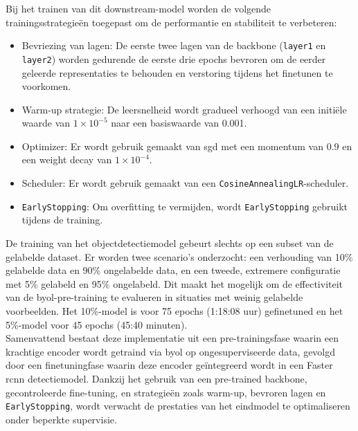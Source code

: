 \clearpage

Bij het trainen van dit downstream-model worden de volgende trainingsstrategieën toegepast om de performantie en stabiliteit te verbeteren:

\begin{itemize}
    \item Bevriezing van lagen: De eerste twee lagen van de backbone (\texttt{layer1} en \texttt{layer2}) worden gedurende de eerste drie epochs bevroren om de eerder geleerde representaties te behouden en verstoring tijdens het finetunen te voorkomen.
    \item Warm-up strategie: De leersnelheid wordt gradueel verhoogd van een initiële waarde van $1 \times 10^{-5}$ naar een basiswaarde van 0.001.
    \item Optimizer: Er wordt gebruik gemaakt van \gls{sgd} met een momentum van 0.9 en een weight decay van $1 \times 10^{-4}$.
    \item Scheduler: Er wordt gebruik gemaakt van een \texttt{CosineAnnealingLR}-scheduler.
    \item \texttt{EarlyStopping}: Om overfitting te vermijden, wordt \texttt{EarlyStopping} gebruikt tijdens de training.
\end{itemize}

De training van het objectdetectiemodel gebeurt slechts op een subset van de gelabelde dataset. Er worden twee scenario's onderzocht: een verhouding van 10\% gelabelde data en 90\% ongelabelde data, en een tweede, extremere configuratie met 5\% gelabeld en 95\% ongelabeld. Dit maakt het mogelijk om de effectiviteit van de \gls{byol}-pre-training te evalueren in situaties met weinig gelabelde voorbeelden. Het 10\%-model is voor 75 epochs (1:18:08 uur) gefinetuned en het 5\%-model voor 45 epochs (45:40 minuten). \\

Samenvattend bestaat deze implementatie uit een pre-trainingsfase waarin een krachtige encoder wordt getraind via \gls{byol} op ongesuperviseerde data, gevolgd door een finetuningfase waarin deze encoder geïntegreerd wordt in een Faster \gls{rcnn} detectiemodel. Dankzij het gebruik van een pre-trained backbone, gecontroleerde fine-tuning, en strategieën zoals warm-up, bevroren lagen en \texttt{EarlyStopping}, wordt verwacht de prestaties van het eindmodel te optimaliseren onder beperkte supervisie.